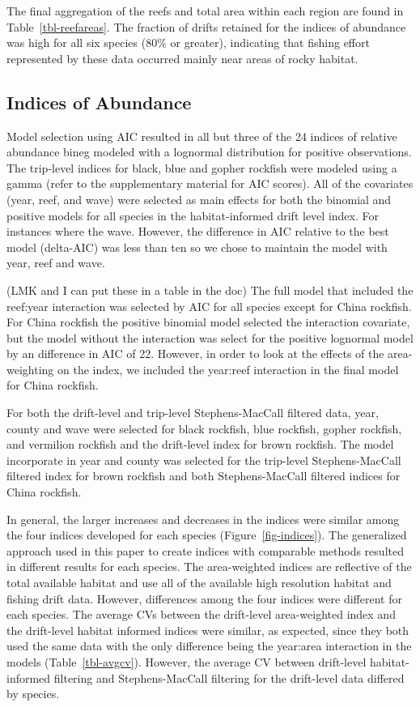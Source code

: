 \documentclass[
  12pt,
  authoryear,
  preprint,
  3p]{elsarticle}
\begin{document}
The final aggregation of the reefs and total area within each region are
found in Table~\ref{tbl-reefareas}. The fraction of drifts retained for
the indices of abundance was high for all six species (80\% or greater),
indicating that fishing effort represented by these data occurred mainly
near areas of rocky habitat.

\hypertarget{indices-of-abundance-1}{%
\subsection{Indices of Abundance}\label{indices-of-abundance-1}}

Model selection using AIC resulted in all but three of the 24 indices of
relative abundance bineg modeled with a lognormal distribution for
positive observations. The trip-level indices for black, blue and gopher
rockfish were modeled using a gamma (refer to the supplementary material
for AIC scores). All of the covariates (year, reef, and wave) were
selected as main effects for both the binomial and positive models for
all species in the habitat-informed drift level index. For instances
where the wave. However, the difference in AIC relative to the best
model (delta-AIC) was less than ten so we chose to maintain the model
with year, reef and wave.

(LMK and I can put these in a table in the doc) The full model that
included the reef:year interaction was selected by AIC for all species
except for China rockfish. For China rockfish the positive binomial
model selected the interaction covariate, but the model without the
interaction was select for the positive lognormal model by an difference
in AIC of 22. However, in order to look at the effects of the
area-weighting on the index, we included the year:reef interaction in
the final model for China rockfish.

For both the drift-level and trip-level Stephens-MacCall filtered data,
year, county and wave were selected for black rockfish, blue rockfish,
gopher rockfish, and vermilion rockfish and the drift-level index for
brown rockfish. The model incorporate in year and county was selected
for the trip-level Stephens-MacCall filtered index for brown rockfish
and both Stephens-MacCall filtered indices for China rockfish.

In general, the larger increases and decreases in the indices were
similar among the four indices developed for each species
(Figure~\ref{fig-indices}). The generalized approach used in this paper
to create indices with comparable methods resulted in different results
for each species. The area-weighted indices are reflective of the total
available habitat and use all of the available high resolution habitat
and fishing drift data. However, differences among the four indices were
different for each species. The average CVs between the drift-level
area-weighted index and the drift-level habitat informed indices were
similar, as expected, since they both used the same data with the only
difference being the year:area interaction in the models
(Table~\ref{tbl-avgcv}). However, the average CV between drift-level
habitat-informed filtering and Stephens-MacCall filtering for the
drift-level data differed by species.
\end{document}
